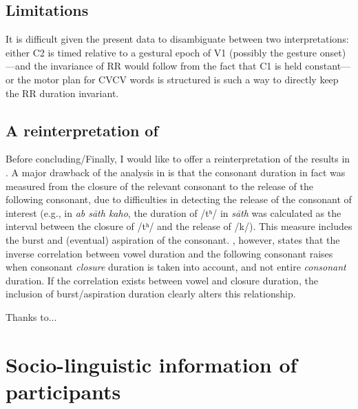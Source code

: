 \documentclass[preprint]{JASAnew}
\begin{document}
\hypertarget{limitations}{%
\subsection{Limitations}\label{limitations}}

It is difficult given the present data to disambiguate between two
interpretations: either C2 is timed relative to a gestural epoch of V1
(possibly the gesture onset)---and the invariance of RR would follow
from the fact that C1 is held constant--- or the motor plan for CVCV
words is structured is such a way to directly keep the RR duration
invariant.

\hypertarget{a-reinterpretation-of-maddieson1976}{%
\subsection{\texorpdfstring{A reinterpretation of
\citet{maddieson1976}}{A reinterpretation of @maddieson1976}}\label{a-reinterpretation-of-maddieson1976}}

Before concluding/Finally, I would like to offer a reinterpretation of
the results in \citet{maddieson1976}. A major drawback of the analysis
in \citet{maddieson1976} is that the consonant duration in fact was
measured from the closure of the relevant consonant to the release of
the following consonant, due to difficulties in detecting the release of
the consonant of interest (e.g., in \emph{ab sāth kaho}, the duration of
/tʰ/ in \emph{sāth} was calculated as the interval between the closure
of /tʰ/ and the release of /k/). This measure includes the burst and
(eventual) aspiration of the consonant. \citet{slis1969a}, however,
states that the inverse correlation between vowel duration and the
following consonant raises when consonant \emph{closure} duration is
taken into account, and not entire \emph{consonant} duration. If the
correlation exists between vowel and closure duration, the inclusion of
burst/aspiration duration clearly alters this relationship.

\begin{acknowledgments}
Thanks to...
\end{acknowledgments}

\appendix

\section{Socio-linguistic information of participants}
\label{a:socioling}
\end{document}
